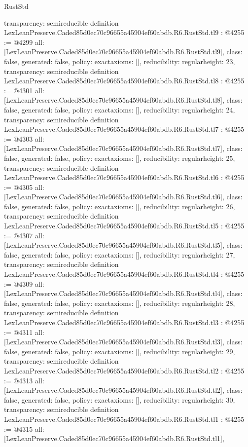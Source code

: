 \begin{lexlean}{RustStd}
\begin{coremodule}
{  transparency: semireducible
}
definition LexLeanPreserve.Caded85d0ec70c96655a45904ef60abdb.R6.RustStd.tl9 : @4255 := @4299 {
  all: [LexLeanPreserve.Caded85d0ec70c96655a45904ef60abdb.R6.RustStd.tl9],
  class: false,
  generated: false,
  policy: exact{axioms: []},
  reducibility: regular{height: 23},
  transparency: semireducible
}
definition LexLeanPreserve.Caded85d0ec70c96655a45904ef60abdb.R6.RustStd.tl8 : @4255 := @4301 {
  all: [LexLeanPreserve.Caded85d0ec70c96655a45904ef60abdb.R6.RustStd.tl8],
  class: false,
  generated: false,
  policy: exact{axioms: []},
  reducibility: regular{height: 24},
  transparency: semireducible
}
definition LexLeanPreserve.Caded85d0ec70c96655a45904ef60abdb.R6.RustStd.tl7 : @4255 := @4303 {
  all: [LexLeanPreserve.Caded85d0ec70c96655a45904ef60abdb.R6.RustStd.tl7],
  class: false,
  generated: false,
  policy: exact{axioms: []},
  reducibility: regular{height: 25},
  transparency: semireducible
}
definition LexLeanPreserve.Caded85d0ec70c96655a45904ef60abdb.R6.RustStd.tl6 : @4255 := @4305 {
  all: [LexLeanPreserve.Caded85d0ec70c96655a45904ef60abdb.R6.RustStd.tl6],
  class: false,
  generated: false,
  policy: exact{axioms: []},
  reducibility: regular{height: 26},
  transparency: semireducible
}
definition LexLeanPreserve.Caded85d0ec70c96655a45904ef60abdb.R6.RustStd.tl5 : @4255 := @4307 {
  all: [LexLeanPreserve.Caded85d0ec70c96655a45904ef60abdb.R6.RustStd.tl5],
  class: false,
  generated: false,
  policy: exact{axioms: []},
  reducibility: regular{height: 27},
  transparency: semireducible
}
definition LexLeanPreserve.Caded85d0ec70c96655a45904ef60abdb.R6.RustStd.tl4 : @4255 := @4309 {
  all: [LexLeanPreserve.Caded85d0ec70c96655a45904ef60abdb.R6.RustStd.tl4],
  class: false,
  generated: false,
  policy: exact{axioms: []},
  reducibility: regular{height: 28},
  transparency: semireducible
}
definition LexLeanPreserve.Caded85d0ec70c96655a45904ef60abdb.R6.RustStd.tl3 : @4255 := @4311 {
  all: [LexLeanPreserve.Caded85d0ec70c96655a45904ef60abdb.R6.RustStd.tl3],
  class: false,
  generated: false,
  policy: exact{axioms: []},
  reducibility: regular{height: 29},
  transparency: semireducible
}
definition LexLeanPreserve.Caded85d0ec70c96655a45904ef60abdb.R6.RustStd.tl2 : @4255 := @4313 {
  all: [LexLeanPreserve.Caded85d0ec70c96655a45904ef60abdb.R6.RustStd.tl2],
  class: false,
  generated: false,
  policy: exact{axioms: []},
  reducibility: regular{height: 30},
  transparency: semireducible
}
definition LexLeanPreserve.Caded85d0ec70c96655a45904ef60abdb.R6.RustStd.tl1 : @4255 := @4315 {
  all: [LexLeanPreserve.Caded85d0ec70c96655a45904ef60abdb.R6.RustStd.tl1],
}
\end{coremodule}
\end{lexlean}
